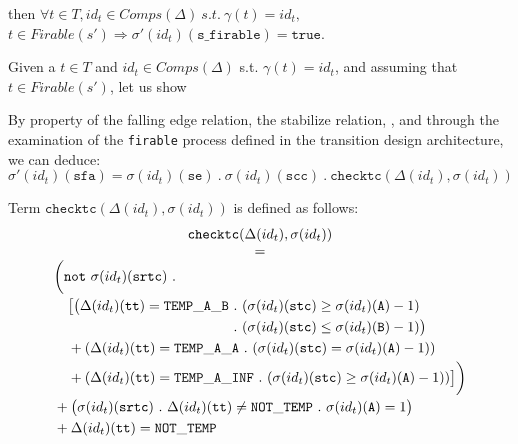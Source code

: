 \documentclass[dvipsnames,12pt]{article}
\begin{document}
\begin{lemma}
  \label{lem:fe-equal-firable-1}
  \fehyps{} then
  $\forall{}t\in{}T,id_t\in{}Comps(\Delta)~s.t.~\gamma(t)=id_t,$
  $t\in{}Firable(s')\Rightarrow\sigma'(id_t)(\texttt{s\_firable})=\mathtt{true}$.
\end{lemma}

\begin{niproof}
  Given a $t\in{}T$ and $id_t\in{}Comps(\Delta)$
  s.t. $\gamma(t)=id_t$, and assuming that $t\in{}Firable(s')$, let us
  show \\
  
  \exT{}

  By property of the \hvhdl{} falling edge relation, the stabilize
  relation, \InCsCompT, and through the examination of the
  \texttt{firable} process defined in the transition design
  architecture, we can deduce:
  \begin{equation}
    \label{eq:fe-eq-sfa}
    \sigma'(id_t)(\texttt{sfa})=\sigma(id_t)(\texttt{se})~.~\sigma(id_t)(\texttt{scc})~.~\mathtt{checktc}(\Delta(id_t),\sigma(id_t))
  \end{equation}

  Term $\mathtt{checktc}(\Delta(id_t),\sigma(id_t))$ is defined as
  follows:
  \begin{equation}
    \label{eq:checktc}    
    \begin{array}{@{}c@{}}
      \mathtt{checktc}(\Delta(id_t),\sigma(id_t)) \\
      = \\
      {\begin{split}
        &\bigg(\mathtt{not}~\sigma(id_t)(\texttt{srtc})~.~\\
        & \quad\begin{split}
          \big[\big(\Delta(id_t)(\texttt{tt})=\mathtt{TEMP\_A\_B}~&.~(\sigma(id_t)(\texttt{stc})\ge{}\sigma(id_t)(\texttt{A})-1)~\\
          &.~(\sigma(id_t)(\texttt{stc})\le{}\sigma(id_t)(\texttt{B})-1)\big)\\
        \end{split} \\
        & \quad+(\Delta(id_t)(\texttt{tt})=\mathtt{TEMP\_A\_A}~.~(\sigma(id_t)(\texttt{stc})={}\sigma(id_t)(\texttt{A})-1))\\
        &
        \quad+(\Delta(id_t)(\texttt{tt})=\mathtt{TEMP\_A\_INF}~.~(\sigma(id_t)(\texttt{stc})\ge{}\sigma(id_t)(\texttt{A})-1))\big]\bigg) \\
        & +\big(\sigma(id_t)(\texttt{srtc})~.~\Delta(id_t)(\texttt{tt})\neq\mathtt{NOT\_TEMP}~.~\sigma(id_t)(\texttt{A})=1\big)\\
        & +\Delta(id_t)(\texttt{tt})=\mathtt{NOT\_TEMP}\\
      \end{split}} \\
    \end{array}
  \end{equation}


\end{niproof}
\end{document}
